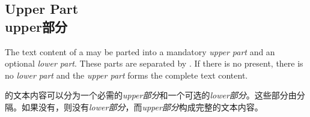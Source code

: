 \setcounter{section}{4}
\setcounter{subsection}{2}
\setcounter{subsubsection}{0}
\subsection{Upper Part\\upper部分} 

The text content of a  may be parted into a mandatory \emph{upper part}
and an optional \emph{lower part}. These parts are separated by
. If there is no  present, there is no
\emph{lower part} and the \emph{upper part} forms the complete text content.


 的文本内容可以分为一个必需的\emph{upper部分}和一个可选的\emph{lower部分}。这些部分由分隔。如果没有，则没有\emph{lower部分}，而\emph{upper部分}构成完整的文本内容。

